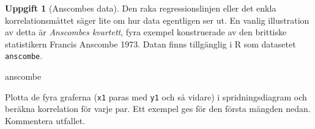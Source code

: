 \documentclass[
]{book}
\newenvironment{Shaded}{\begin{snugshade}}{\end{snugshade}}
\newcommand{\FunctionTok}[1]{\textcolor[rgb]{0.00,0.00,0.00}{#1}}
\newcommand{\NormalTok}[1]{#1}
\newcommand{\SpecialCharTok}[1]{\textcolor[rgb]{0.00,0.00,0.00}{#1}}
\theoremstyle{definition}
\theoremstyle{definition}
\theoremstyle{definition}
\newtheorem{exercise}{Uppgift}[chapter]
\theoremstyle{definition}
\theoremstyle{remark}
\begin{document}
\begin{exercise}[Anscombes data]

Den raka regressionslinjen eller det enkla korrelationsmåttet säger lite om hur data egentligen ser ut. En vanlig illustration av detta är \emph{Anscombes kvartett}, fyra exempel konstruerade av den brittiske statistikern Francis Anscombe 1973. Datan finns tillgänglig i R som datasetet \texttt{anscombe}.

\begin{Shaded}
\begin{Highlighting}[]
\NormalTok{anscombe}
\end{Highlighting}
\end{Shaded}

Plotta de fyra graferna (\texttt{x1} paras med \texttt{y1} och så vidare) i spridningsdiagram och beräkna korrelation för varje par. Ett exempel ges för den första mängden nedan. Kommentera utfallet.

\begin{Shaded}
\end{Shaded}

\end{exercise}
\end{document}
